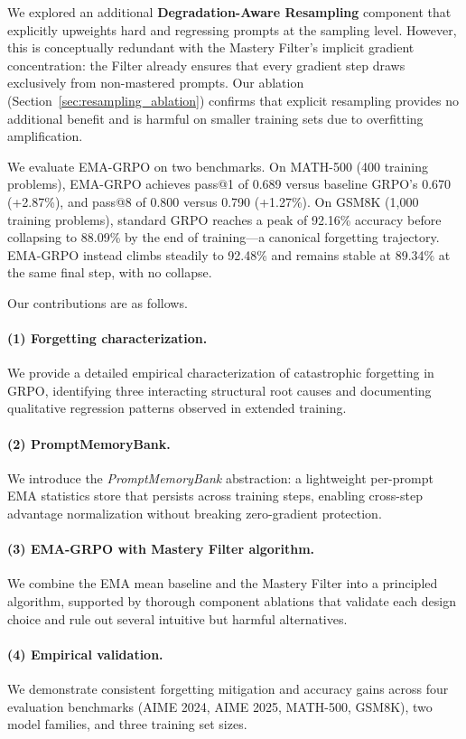 \documentclass[11pt]{article}
\newcommand{\method}{EMA-GRPO}
\newcommand{\methodfull}{EMA-GRPO with Mastery Filter}
\theoremstyle{definition}
\begin{document}
We explored an additional \textbf{Degradation-Aware Resampling} component
that explicitly upweights hard and regressing prompts at the sampling level.
However, this is conceptually redundant with the Mastery Filter's implicit
gradient concentration: the Filter already ensures that every gradient step
draws exclusively from non-mastered prompts.
Our ablation (Section~\ref{sec:resampling_ablation}) confirms that explicit
resampling provides no additional benefit and is harmful on smaller training
sets due to overfitting amplification.

We evaluate \method{} on two benchmarks.
On MATH-500 (400 training problems), \method{} achieves pass@1 of 0.689 versus
baseline GRPO's 0.670 (+2.87\%), and pass@8 of 0.800 versus 0.790 (+1.27\%).
On GSM8K (1{,}000 training problems), standard GRPO reaches a peak of 92.16\%
accuracy before collapsing to 88.09\% by the end of training—a canonical
forgetting trajectory. \method{} instead climbs steadily to 92.48\% and
remains stable at 89.34\% at the same final step, with no collapse.

Our contributions are as follows.

\paragraph{(1) Forgetting characterization.}
We provide a detailed empirical characterization of catastrophic forgetting
in GRPO, identifying three interacting structural root causes and documenting
qualitative regression patterns observed in extended training.

\paragraph{(2) PromptMemoryBank.}
We introduce the \emph{PromptMemoryBank} abstraction: a lightweight
per-prompt EMA statistics store that persists across training steps,
enabling cross-step advantage normalization without breaking
zero-gradient protection.

\paragraph{(3) \methodfull{} algorithm.}
We combine the EMA mean baseline and the Mastery Filter into a principled
algorithm, supported by thorough component ablations that validate each design
choice and rule out several intuitive but harmful alternatives.

\paragraph{(4) Empirical validation.}
We demonstrate consistent forgetting mitigation and accuracy gains across
four evaluation benchmarks (AIME 2024, AIME 2025, MATH-500, GSM8K),
two model families, and three training set sizes.
\end{document}
